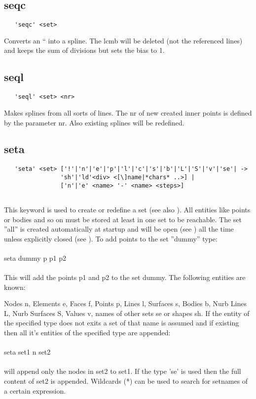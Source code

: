 \documentclass{article}
\begin{document}
\subsection{\label{seqc}seqc}
\begin{verbatim}
   'seqc' <set>
\end{verbatim}
Converts an `` into a spline. The lcmb will be deleted (not the referenced lines) and keeps the sum of divisions but sets the bias to 1.

\subsection{\label{seql}seql}
\begin{verbatim}
   'seql' <set> <nr>
\end{verbatim}
Makes splines from all sorts of lines. The nr of new created inner points is defined by the parameter nr. Also existing splines will be redefined.

\subsection{\label{seta}seta}
\begin{verbatim}
   'seta' <set> ['!'|'n'|'e'|'p'|'l'|'c'|'s'|'b'|'L'|'S'|'v'|'se'| ->
                'sh'|'ld'<div> <[\]name|*chars* ..>] |
                ['n'|'e' <name> '-' <name> <steps>]
                
\end{verbatim}
This keyword is used to create or redefine a set (see also ). All entities like points or bodies and so on must be stored at least in one set to be reachable. The set ''all'' is created automatically at startup and will be open (see ) all the time unless explicitly closed (see ). To add points to the set ''dummy'' type:\\\\seta dummy p p1 p2\\\\This will add the points p1 and p2 to the set dummy. The following entities are known:

Nodes n, Elements e, Faces f, Points p, Lines l, Surfaces s, Bodies b, Nurb Lines L, Nurb Surfaces S, Values v, names of other sets se or shapes sh. If the entity of the specified type does not exits a set of that name is assumed and if existing then all it's entities of the specified type are appended:\\\\seta set1 n set2\\\\will append only the nodes in set2 to set1. If the type 'se' is used then the full content of set2 is appended. Wildcards (*) can be used to search for setnames of a certain expression.
\end{document}
